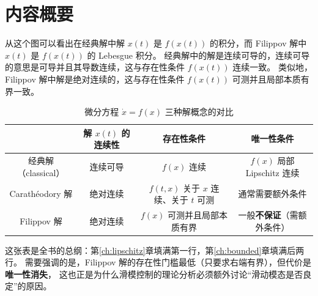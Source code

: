 \section{内容概要}\label{sec:continuity-summary}

从这个图可以看出在经典解中解 $x(t)$ 是 $f(x(t))$ 的积分，而 Filippov 解中 $x(t)$ 是 $f(x(t))$ 的 Lebesgue 积分。
经典解中的解是连续可导的，连续可导的意思是可导并且其导数连续，这与存在性条件 $f(x(t))$ 连续一致。
类似地，Filippov 解中解是绝对连续的，这与存在性条件 $f(x(t))$ 可测并且局部本质有界一致。

\begin{table}[!htp]
  \centering
  \small
  \begin{tabular}{|c|c|c|c|}
    \hline
    & 解 $x(t)$ 的连续性 & 存在性条件 & 唯一性条件 \\\hline
    经典解（classical） & 连续可导 &
    $f(x)$ 连续 & $f(x)$ 局部 Lipschitz 连续\\\hline
    Carathéodory 解 & 绝对连续 &
    $f(t,x)$ 关于 $x$ 连续、关于 $t$ 可测 & 通常需要额外条件\\\hline
    Filippov 解 & 绝对连续 &
    $f(x)$ 可测并且局部本质有界 & 一般\textbf{不保证}（需额外条件）\\\hline
  \end{tabular}
  \caption{微分方程 $\dot{x}=f(x)$ 三种解概念的对比}
  \label{tab:solution-concepts}
\end{table}

这张表是全书的总纲：第\ref{ch:lipschitz}章填满第一行，第\ref{ch:bounded}章填满后两行。
需要强调的是，Filippov 解的存在性门槛最低（只要求右端有界），但代价是\textbf{唯一性消失}，
这也正是为什么滑模控制的理论分析必须额外讨论“滑动模态是否良定”的原因。

